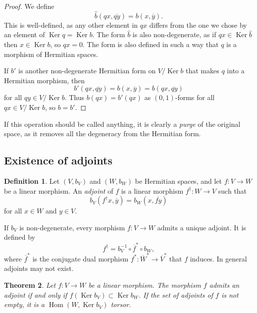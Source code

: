 \documentclass[10pt,a4paper]{amsart}
\newtheorem{theo}{Theorem}[section]
\theoremstyle{definition}
\newtheorem{defi}[theo]{Definition}
\def\ov#1{\overline{#1}}
\DeclareMathOperator{\Ker}{Ker}
\DeclareMathOperator{\Hom}{Hom}
\begin{document}
\begin{proof}
We define
\[
\hat b(qx, \ov{qy})
= b(x, \ov y).
\]
This is well-defined, as any other element in $qx$ differs from the one we chose by an element of $\Ker q = \Ker b$. The form $\hat b$ is also non-degenerate, as if $qx \in \Ker \hat b$ then $x \in \Ker b$, so $qx = 0$. The form is also defined in such a way that $q$ is a morphism of Hermitian spaces.

If $b'$ is another non-degenerate Hermitian form on $V / \Ker b$ that makes $q$ into a Hermitian morphism, then
\[
b'(qx, \ov{qy})
= b(x, \ov{y})
= b(qx, \ov{qy})
\]
for all $qy \in V / \Ker b$. Thus $b(qx) = b'(qx)$ as $(0,1)$-forms for all $qx \in V / \Ker b$, so $b = b'$.
\end{proof}


If this operation should be called anything, it is clearly a \emph{purge} of the original space, as it removes all the degeneracy from the Hermitian form.



\subsection*{Existence of adjoints}
\label{sec:existence-adjoints}




\begin{defi}
Let $(V, b_V)$ and $(W, b_W)$ be Hermitian spaces, and let $f : V \to W$ be a linear morphism. An \emph{adjoint} of $f$ is a linear morphism $f^\dagger : W \to V$ such that
\[
b_V(f^\dagger x, \ov y)
= b_W(x, \ov{f y})
\]
for all $x \in W$ and $y \in V$.
\end{defi}


If $b_V$ is non-degenerate, every morphism $f : V \to W$ admits a unique adjoint. It is defined by
\[
f^\dagger = b_V^{-1} \circ \ov f^* \circ b_W,
\]
where $\ov f^*$ is the conjugate dual morphism $f^* : \ov W^* \to \ov V^*$ that $f$ induces. In general adjoints may not exist.


\begin{theo}
Let $f : V \to W$ be a linear morphism. The morphism $f$ admits an adjoint if and only if $f(\Ker b_V) \subset \Ker b_W$. If the set of adjoints of $f$ is not empty, it is a $\Hom(W, \Ker b_V)$ torsor.
\end{theo}
\end{document}
